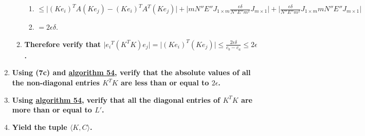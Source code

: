 \documentclass[twocolumn]{article}
\begin{document}
\begin{enumerate}
\begin{enumerate}
\begin{enumerate}
						\item $\le\lvert(Ke_i)^TA(Ke_j)-(Ke_i)^TA^T(Ke_j)\rvert+\lvert mN''E''J_{1\times m}\frac{\epsilon\delta}{N''E''m^2}J_{m\times 1}\rvert+\lvert\frac{\epsilon\delta}{N''E''m^2}J_{1\times m}mN''E''J_{m\times 1}\rvert$
						\item $=2\epsilon\delta$.
					\end{enumerate}
					\item \textbf{Therefore verify that $\lvert {e_i}^T(K^TK)e_j\rvert=\lvert(Ke_i)^T(Ke_j)\rvert\le\frac{2\epsilon\delta}{c_b-c_a}\le 2\epsilon$.}
				\end{enumerate}
				\item \textbf{Using (7c) and \hyperref[sec:algorithm 54]{algorithm 54}, verify that the absolute values of all the non-diagonal entries $K^TK$ are less than or equal to $2\epsilon$.}
				\item \textbf{Using \hyperref[sec:algorithm 54]{algorithm 54}, verify that all the diagonal entries of $K^TK$ are more than or equal to $L'$.}
				\item \textbf{Yield the tuple $\langle K,C\rangle$.}
			\end{enumerate}
\end{document}
